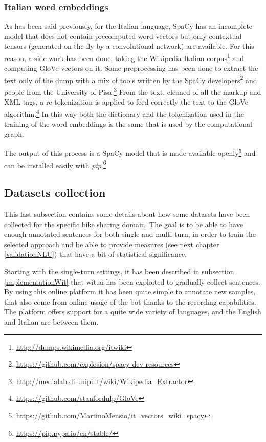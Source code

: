 \subsubsection{Italian word embeddings}
As has been said previously, for the Italian language, SpaCy has an incomplete model that does not contain precomputed word vectors but only contextual tensors (generated on the fly by a convolutional network) are available. For this reason, a side work has been done, taking the Wikipedia Italian corpus\footnote{\url{http://dumps.wikimedia.org/itwiki}} and computing GloVe vectors on it. Some preprocessing has been done to extract the text only of the dump with a mix of tools written by the SpaCy developers\footnote{\url{https://github.com/explosion/spacy-dev-resources}} and people from the University of Pisa.\footnote{\url{http://medialab.di.unipi.it/wiki/Wikipedia\_Extractor}} From the text, cleaned of all the markup and XML tags, a re-tokenization is applied to feed correctly the text to the GloVe algorithm.\footnote{\url{https://github.com/stanfordnlp/GloVe}} In this way both the dictionary and the tokenization used in the training of the word embeddings is the same that is used by the computational graph.

The output of this process is a SpaCy model that is made available openly\footnote{\url{https://github.com/MartinoMensio/it\_vectors\_wiki\_spacy}} and can be installed easily with \textit{pip}.\footnote{\url{https://pip.pypa.io/en/stable/}}

\subsection{Datasets collection}
\label{implementationDatasets}

This last subsection contains some details about how some datasets have been collected for the specific bike sharing domain. The goal is to be able to have enough annotated sentences for both single and multi-turn, in order to train the selected approach and be able to provide measures (see next chapter \ref{validationNLU}) that have a bit of statistical significance.

Starting with the single-turn settings, it has been described in subsection \ref{implementationWit} that wit.ai has been exploited to gradually collect sentences. By using this online platform it has been quite simple to annotate new samples, that also come from online usage of the bot thanks to the recording capabilities. The platform offers support for a quite wide variety of languages, and the English and Italian are between them.

